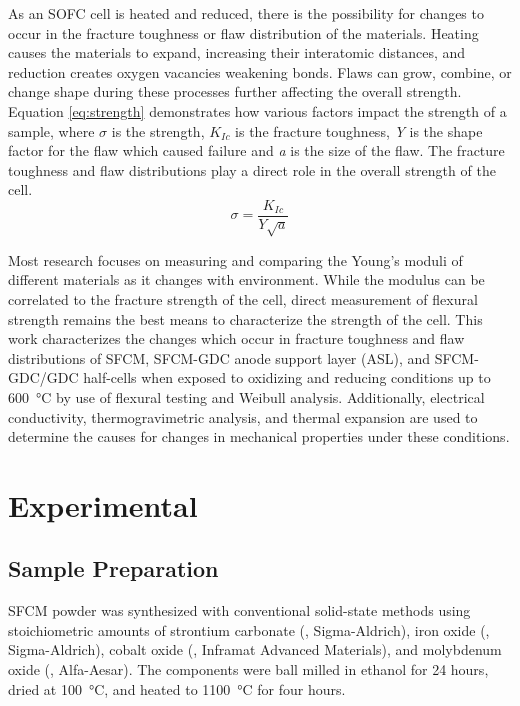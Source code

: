     As an SOFC cell is heated and reduced, there is the possibility for changes to occur in the fracture toughness or flaw distribution of the materials.
    Heating causes the materials to expand, increasing their interatomic distances, and reduction creates oxygen vacancies weakening bonds.\cite{Boroomand2000,Bishop2009}
    Flaws can grow, combine, or change shape during these processes further affecting the overall strength.
    Equation \ref{eq:strength} demonstrates how various factors impact the strength of a sample, where $\sigma$ is the strength, $K_{Ic}$ is the fracture toughness, \textit{Y} is the shape factor for the flaw which caused failure and \textit{a} is the size of the flaw.\cite{Green1998}
    The fracture toughness and flaw distributions play a direct role in the overall strength of the cell.
    \begin{equation}
        \sigma = \frac{K_{Ic}}{Y\sqrt{a}}
        \label{eq:strength}
    \end{equation}

    Most research focuses on measuring and comparing the Young's moduli of different materials as it changes with environment.\cite{Gutierrez-Mora2002,Giraud2008,Kushi2011,Amezawa2011}
    While the modulus can be correlated to the fracture strength of the cell, direct measurement of flexural strength remains the best means to characterize the strength of the cell.
    This work characterizes the changes which occur in fracture toughness and flaw distributions of SFCM, SFCM-GDC anode support layer (ASL), and SFCM-GDC/GDC half-cells when exposed to oxidizing and reducing conditions up to \SI{600}{\celsius} by use of flexural testing and Weibull analysis.
    Additionally, electrical conductivity, thermogravimetric analysis, and thermal expansion are used to determine the causes for changes in mechanical properties under these conditions.

\section{Experimental}
    \subsection{Sample Preparation}
        SFCM powder was synthesized with conventional solid-state methods using stoichiometric amounts of strontium carbonate (, Sigma-Aldrich), iron oxide (, Sigma-Aldrich), cobalt oxide (, Inframat Advanced Materials), and molybdenum oxide (, Alfa-Aesar). The components were ball milled in ethanol for 24 hours, dried at \SI{100}{\celsius}, and heated to \SI{1100}{\celsius} for four hours.

